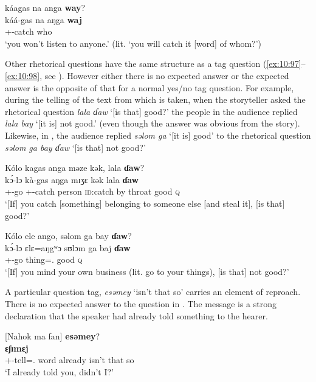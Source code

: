 \clearpage
     \medskip
káagas  na  anga  \textbf{way}?\\
\gll káá-gas na aŋga \textbf{waj}\\
     {\twoS}+{\POT}-catch  {\PSP}  {\POSS} who\\
\glt  ‘you won't listen to anyone.' (lit. ‘you will catch it [word] of whom?’) 
\z 

Other rhetorical questions have the same structure as a tag question (\ref{ex:10:97}–\ref{ex:10:98}, see ). However either there is no expected answer or the expected answer is the opposite of that for a normal yes/no tag question. For example, during the telling of the text from which  is taken, when the storyteller asked the rhetorical question \textit{lala  ɗaw} ‘[is that] good?’ the people in the audience replied \textit{lala bay} ‘[it is] not good.’ (even though the answer was obvious from the story). Likewise, in , the audience replied \textit{səlom ga} ‘[it is] good’ to the rhetorical question \textit{səlom ga bay ɗaw} ‘[is that] not good?’

\ea \label{ex:10:97}
Kólo  kagas  anga  məze  kək,  lala  \textbf{ɗaw}?\\
\gll  k\'{ɔ}-lɔ  kà-gas    aŋga  mɪʒɛ  kək      lala  \textbf{ɗaw}\\
      {\twoS}+{\IFV}-go  {\twoS}+{\PFV}-catch  {\POSS}  person  {\textsc{id}:catch by throat}    good  {\textsc{q}}\\
\glt  ‘[If] you catch [something] belonging to someone else [and steal it], [is that] good?’
\z 

\ea \label{ex:10:98}
Kólo  ele  ango,  səlom  ga  bay  \textbf{ɗaw}?\\
\gll  k\'{ɔ}-lɔ  ɛlɛ=aŋgʷɔ    sʊlɔm  ga  baj  \textbf{ɗaw}\\
      {\twoS}+{\IFV}-go  thing={\twoS}.{\POSS}  good  {\ADJ}  {\NEG}  {\textsc{q}}\\
\glt  ‘[If] you mind your own business (lit. go to your things), [is that] not good?’
\z 

A particular question tag, \textit{esəmey} ‘isn’t that so’ carries an element of reproach. There is no expected answer to the question in . The message is a strong declaration that the speaker had already told something to the hearer. 

\ea \label{ex:10:99}
[Nahok ma  fan] \textbf{esəmey}?\\
\gll  [nà-h=ɔkʷ     ma  faŋ]  \textbf{ɛʃɪmɛj}\\
      {\oneS}+{\PFV}-tell={\twoS}.{\IO}  word  already  {isn’t that so}\\
\glt  ‘I already told you, didn’t I?’
\z 

